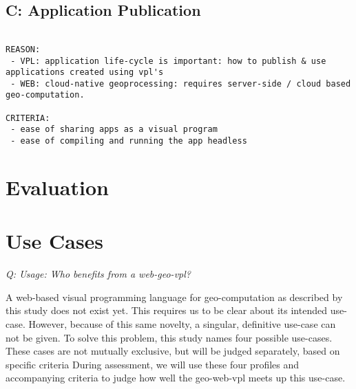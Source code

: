 \subsection*{C: Application Publication} 
\begin{lstlisting}

REASON: 
 - VPL: application life-cycle is important: how to publish & use applications created using vpl's
 - WEB: cloud-native geoprocessing: requires server-side / cloud based geo-computation.  

CRITERIA:
 - ease of sharing apps as a visual program
 - ease of compiling and running the app headless
\end{lstlisting}









\section{Evaluation}
 



\section{Use Cases}

\emph{Q: Usage: Who benefits from a web-geo-vpl? }

A web-based visual programming language for geo-computation as described by this study does not exist yet. 
This requires us to be clear about its intended use-case. 
However, because of this same novelty, a singular, definitive use-case can not be given.
To solve this problem, this study names four possible use-cases. 
These cases are not mutually exclusive, but will be judged separately, based on specific criteria 
During assessment, we will use these four profiles and accompanying criteria to judge how well the geo-web-vpl meets up this use-case.

